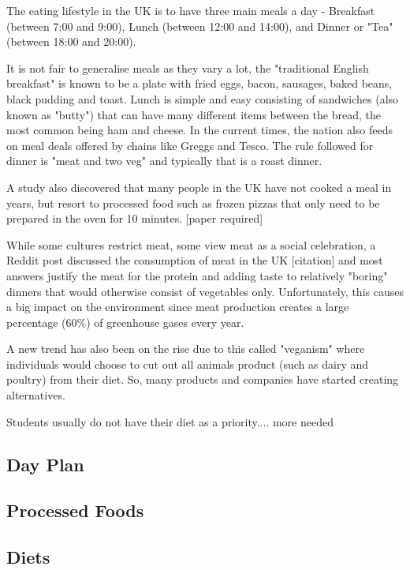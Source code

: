 \documentclass{l4proj}
\begin{document}
The eating lifestyle in the UK is to have three main meals a day - Breakfast (between 7:00 and 9:00), Lunch (between 12:00 and 14:00), and Dinner or "Tea" (between 18:00 and 20:00).

It is not fair to generalise meals as they vary a lot, the "traditional English breakfast" is known to be a plate with fried eggs, bacon, sausages, baked beans, black pudding and toast. Lunch is simple and easy consisting of sandwiches (also known as "butty") that can have many different items between the bread, the most common being ham and cheese. In the current times, the nation also feeds on meal deals offered by chains like Greggs and Tesco. The rule followed for dinner is "meat and two veg" and typically that is a roast dinner.

A study also discovered that many people in the UK have not cooked a meal in years, but resort to processed food such as frozen pizzas that only need to be prepared in the oven for 10 minutes. [paper required]

While some cultures restrict meat, some view meat as a social celebration, a Reddit post discussed the consumption of meat in the UK [citation] and most answers justify the meat for the protein and adding taste to relatively "boring" dinners that would otherwise consist of vegetables only. Unfortunately, this causes a big impact on the environment since meat production creates a large percentage (60\%) of greenhouse gases every year.

A new trend has also been on the rise due to this called "veganism" where individuals would choose to cut out all animals product (such as dairy and poultry) from their diet. So, many products and companies have started creating alternatives.

Students usually do not have their diet as a priority.... more needed

\subsection{Day Plan}

\subsection{Processed Foods}

\subsection{Diets}
\end{document}
